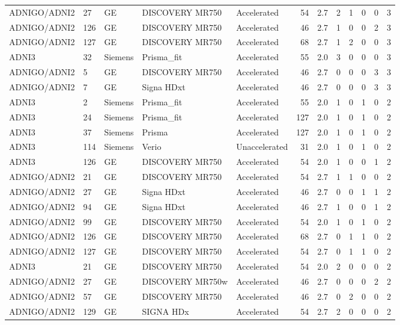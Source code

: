\documentclass{article}
\begin{document}
\begin{landscape}
\begin{longtable}{lllllrrrrrrr}
ADNIGO/ADNI2 & 27 & GE & DISCOVERY MR750 & Accelerated & 54 & 2.7 & 2 & 1 & 0 & 0 & 3 \\
ADNIGO/ADNI2 & 126 & GE & DISCOVERY MR750 & Accelerated & 46 & 2.7 & 1 & 0 & 0 & 2 & 3 \\
ADNIGO/ADNI2 & 127 & GE & DISCOVERY MR750 & Accelerated & 68 & 2.7 & 1 & 2 & 0 & 0 & 3 \\
ADNI3 & 32 & Siemens & Prisma\_fit & Accelerated & 55 & 2.0 & 3 & 0 & 0 & 0 & 3 \\
ADNIGO/ADNI2 & 5 & GE & DISCOVERY MR750 & Accelerated & 46 & 2.7 & 0 & 0 & 0 & 3 & 3 \\
ADNIGO/ADNI2 & 7 & GE & Signa HDxt & Accelerated & 46 & 2.7 & 0 & 0 & 0 & 3 & 3 \\
ADNI3 & 2 & Siemens & Prisma\_fit & Accelerated & 55 & 2.0 & 1 & 0 & 1 & 0 & 2 \\
ADNI3 & 24 & Siemens & Prisma\_fit & Accelerated & 127 & 2.0 & 1 & 0 & 1 & 0 & 2 \\
ADNI3 & 37 & Siemens & Prisma & Accelerated & 127 & 2.0 & 1 & 0 & 1 & 0 & 2 \\
ADNI3 & 114 & Siemens & Verio & Unaccelerated & 31 & 2.0 & 1 & 0 & 1 & 0 & 2 \\
ADNI3 & 126 & GE & DISCOVERY MR750 & Accelerated & 54 & 2.0 & 1 & 0 & 0 & 1 & 2 \\
ADNIGO/ADNI2 & 21 & GE & DISCOVERY MR750 & Accelerated & 54 & 2.7 & 1 & 1 & 0 & 0 & 2 \\
ADNIGO/ADNI2 & 27 & GE & Signa HDxt & Accelerated & 46 & 2.7 & 0 & 0 & 1 & 1 & 2 \\
ADNIGO/ADNI2 & 94 & GE & Signa HDxt & Accelerated & 46 & 2.7 & 1 & 0 & 0 & 1 & 2 \\
ADNIGO/ADNI2 & 99 & GE & DISCOVERY MR750 & Accelerated & 54 & 2.0 & 1 & 0 & 1 & 0 & 2 \\
ADNIGO/ADNI2 & 126 & GE & DISCOVERY MR750 & Accelerated & 68 & 2.7 & 0 & 1 & 1 & 0 & 2 \\
ADNIGO/ADNI2 & 127 & GE & DISCOVERY MR750 & Accelerated & 54 & 2.7 & 0 & 1 & 1 & 0 & 2 \\
ADNI3 & 21 & GE & DISCOVERY MR750 & Accelerated & 54 & 2.0 & 2 & 0 & 0 & 0 & 2 \\
ADNIGO/ADNI2 & 27 & GE & DISCOVERY MR750w & Accelerated & 46 & 2.7 & 0 & 0 & 0 & 2 & 2 \\
ADNIGO/ADNI2 & 57 & GE & DISCOVERY MR750 & Accelerated & 46 & 2.7 & 0 & 2 & 0 & 0 & 2 \\
ADNIGO/ADNI2 & 129 & GE & SIGNA HDx & Accelerated & 54 & 2.7 & 2 & 0 & 0 & 0 & 2 \\

\end{longtable}
\end{landscape}
\end{document}
